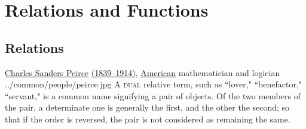 
\chapter{Relations and Functions}

\section{Relations}
\qboxnpq
  {\href{http://en.wikipedia.org/wiki/Charles_Peirce}{Charles Sanders Peirce}
   \href{http://www-history.mcs.st-andrews.ac.uk/Timelines/TimelineF.html}{(1839--1914)},
   \href{http://www-history.mcs.st-andrews.ac.uk/BirthplaceMaps/Places/USA.html}{American} mathematician and logician
   \footnotemark
  }
  {../common/people/peirce.jpg}
  {A \textsc{dual} relative term, such as ``lover," ``benefactor," ``servant,"
   is a common name signifying a pair of objects. 
   Of the two members of the pair, a determinate 
   one is generally the first, and the other the second; 
   so that if the order is reversed, 
   the pair is not considered as remaining the same.}

